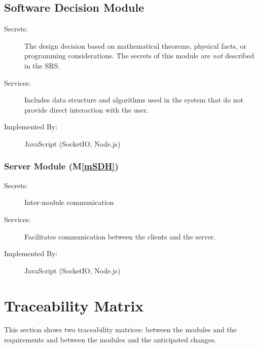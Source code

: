 \documentclass[12pt, titlepage]{article}
\newcommand{\mref}[1]{M\ref{#1}}
\begin{document}

\subsection{Software Decision Module}
\begin{description}
\item[Secrets:] The design decision based on mathematical theorems, physical
  facts, or programming considerations. The secrets of this module are
  \emph{not} described in the SRS.
\item[Services:] Includes data structure and algorithms used in the system that
  do not provide direct interaction with the user. 
\item[Implemented By:] JavaScript (SocketIO, Node.js)
\end{description}

\subsubsection{Server Module (\mref{mSDH})}

\begin{description}
\item[Secrets:] Inter-module communication
\item[Services:] Facilitates communication between the clients and the server.
\item[Implemented By:] JavaScript (SocketIO, Node.js)
\end{description}

\section{Traceability Matrix} \label{SecTM}

This section shows two traceability matrices: between the modules and the
requirements and between the modules and the anticipated changes.
\end{document}

